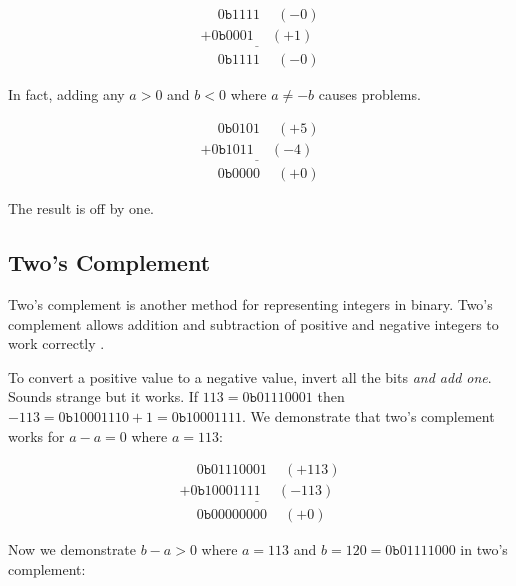 \documentclass{book}
\begin{document}
\begin{equation*}
\begin{array}{c}
\phantom{+}0\texttt{b}1111 \phantom{+}(-0) \\
\underline{+0\texttt{b}0001 \phantom{+}(+1)} \\
\phantom{+}0\texttt{b}1111 \phantom{+}(-0)
\end{array}
\end{equation*}

In fact, adding any $a > 0$ and $b < 0$ where $a \ne -b$ causes problems.

\begin{equation*}
\begin{array}{c}
\phantom{+}0\texttt{b}0101 \phantom{+}(+5) \\
\underline{+0\texttt{b}1011 \phantom{+}(-4)} \\
\phantom{+}0\texttt{b}0000 \phantom{+}(+0)
\end{array}
\end{equation*}

The result is off by one.

\subsection{Two's Complement}

Two's complement is another method for representing integers in binary. Two's complement allows addition and subtraction of positive and negative integers to work correctly \cite{finley_2000}.

To convert a positive value to a negative value, invert all the bits \textit{and add one}. Sounds strange but it works. If $113 = 0\texttt{b}01110001$ then $-113 = 0\texttt{b}10001110 + 1 = 0\texttt{b}10001111$. We demonstrate that two's complement works for $a - a = 0$ where $a = 113$:

\begin{equation*}
\begin{array}{c}
\phantom{+}0\texttt{b}01110001 \phantom{+}(+113) \\
\underline{+0\texttt{b}10001111 \phantom{+}(-113)} \\
\phantom{+}0\texttt{b}00000000 \phantom{+}(+0)\phantom{9}\phantom{9}
\end{array}
\end{equation*}

Now we demonstrate $b - a > 0$ where $a = 113$ and $b = 120 = 0\texttt{b}01111000$ in two's complement:
\end{document}
